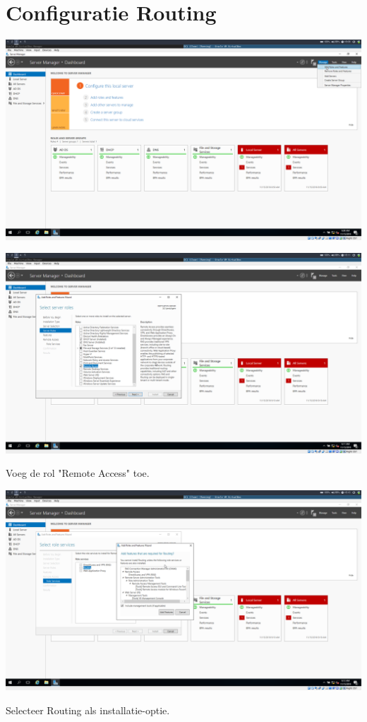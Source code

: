 \documentclass[a4paper]{article}
\begin{document}
\section{Configuratie Routing}
\begin{center}
	\includegraphics[width=15cm]{Pictures/DC1/Routing/1542301791.png}
\end{center}
\begin{center}
	\includegraphics[width=15cm]{Pictures/DC1/Routing/1542301906.png}
	
	Voeg de rol "Remote Access" toe.
\end{center}
\begin{center}
	\includegraphics[width=15cm]{Pictures/DC1/Routing/1542301993.png}
	
	Selecteer Routing als installatie-optie.
\end{center}
\end{document}
